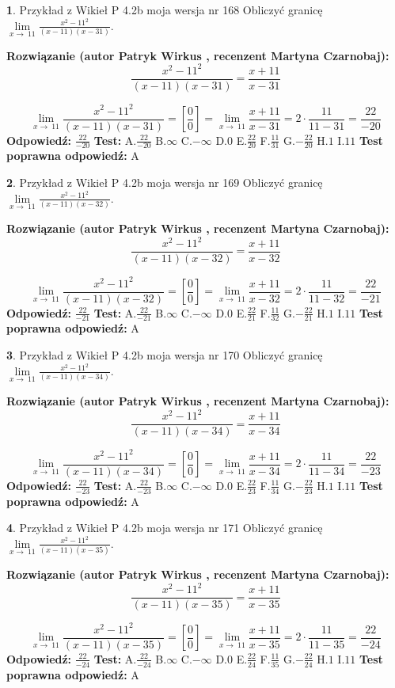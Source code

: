 \documentclass[12pt, a4paper]{article}
\theoremstyle{definition} %
\newtheorem{zad}{}
\newcommand{\zadStart}[1]{\begin{zad}#1\newline}
\newcommand{\zadStop}{\end{zad}}
\newcommand{\rozwStart}[2]{\noindent \textbf{Rozwiązanie (autor #1 , recenzent #2): }\newline}
\newcommand{\rozwStop}{\newline}
\newcommand{\odpStart}{\noindent \textbf{Odpowiedź:}\newline}
\newcommand{\odpStop}{\newline}
\newcommand{\testStart}{\noindent \textbf{Test:}\newline}
\newcommand{\testStop}{\newline}
\newcommand{\kluczStart}{\noindent \textbf{Test poprawna odpowiedź:}\newline}
\newcommand{\kluczStop}{\newline}
\begin{document}
\zadStart{Przykład z Wikieł P 4.2b moja wersja nr 168}
Obliczyć granicę $\lim\limits_{x\to\ 11}\frac{x^{2}-11^{2}}{(x-11)(x-31)}$.
\zadStop
\rozwStart{Patryk Wirkus}{Martyna Czarnobaj}
$$\frac{x^{2}-11^{2}}{(x-11)(x-31)}=\frac{x+11}{x-31}$$

$$\lim\limits_{x\to\ 11}\frac{x^{2}-11^{2}}{(x-11)(x-31)}=[\frac{0}{0}]=\lim\limits_{x\to\ 11}\frac{x+11}{x-31}=2 \cdot \frac{11}{11-31} = \frac{22}{-20}$$
\rozwStop
\odpStart
$\frac{22}{-20}$
\odpStop
\testStart
A.$\frac{22}{-20}$
B.$\infty$
C.$-\infty$
D.$0$
E.$\frac{22}{20}$
F.$\frac{11}{31}$
G.$-\frac{22}{20}$
H.$1$
I.$11$
\testStop
\kluczStart
A
\kluczStop



\zadStart{Przykład z Wikieł P 4.2b moja wersja nr 169}
Obliczyć granicę $\lim\limits_{x\to\ 11}\frac{x^{2}-11^{2}}{(x-11)(x-32)}$.
\zadStop
\rozwStart{Patryk Wirkus}{Martyna Czarnobaj}
$$\frac{x^{2}-11^{2}}{(x-11)(x-32)}=\frac{x+11}{x-32}$$

$$\lim\limits_{x\to\ 11}\frac{x^{2}-11^{2}}{(x-11)(x-32)}=[\frac{0}{0}]=\lim\limits_{x\to\ 11}\frac{x+11}{x-32}=2 \cdot \frac{11}{11-32} = \frac{22}{-21}$$
\rozwStop
\odpStart
$\frac{22}{-21}$
\odpStop
\testStart
A.$\frac{22}{-21}$
B.$\infty$
C.$-\infty$
D.$0$
E.$\frac{22}{21}$
F.$\frac{11}{32}$
G.$-\frac{22}{21}$
H.$1$
I.$11$
\testStop
\kluczStart
A
\kluczStop



\zadStart{Przykład z Wikieł P 4.2b moja wersja nr 170}
Obliczyć granicę $\lim\limits_{x\to\ 11}\frac{x^{2}-11^{2}}{(x-11)(x-34)}$.
\zadStop
\rozwStart{Patryk Wirkus}{Martyna Czarnobaj}
$$\frac{x^{2}-11^{2}}{(x-11)(x-34)}=\frac{x+11}{x-34}$$

$$\lim\limits_{x\to\ 11}\frac{x^{2}-11^{2}}{(x-11)(x-34)}=[\frac{0}{0}]=\lim\limits_{x\to\ 11}\frac{x+11}{x-34}=2 \cdot \frac{11}{11-34} = \frac{22}{-23}$$
\rozwStop
\odpStart
$\frac{22}{-23}$
\odpStop
\testStart
A.$\frac{22}{-23}$
B.$\infty$
C.$-\infty$
D.$0$
E.$\frac{22}{23}$
F.$\frac{11}{34}$
G.$-\frac{22}{23}$
H.$1$
I.$11$
\testStop
\kluczStart
A
\kluczStop



\zadStart{Przykład z Wikieł P 4.2b moja wersja nr 171}
Obliczyć granicę $\lim\limits_{x\to\ 11}\frac{x^{2}-11^{2}}{(x-11)(x-35)}$.
\zadStop
\rozwStart{Patryk Wirkus}{Martyna Czarnobaj}
$$\frac{x^{2}-11^{2}}{(x-11)(x-35)}=\frac{x+11}{x-35}$$

$$\lim\limits_{x\to\ 11}\frac{x^{2}-11^{2}}{(x-11)(x-35)}=[\frac{0}{0}]=\lim\limits_{x\to\ 11}\frac{x+11}{x-35}=2 \cdot \frac{11}{11-35} = \frac{22}{-24}$$
\rozwStop
\odpStart
$\frac{22}{-24}$
\odpStop
\testStart
A.$\frac{22}{-24}$
B.$\infty$
C.$-\infty$
D.$0$
E.$\frac{22}{24}$
F.$\frac{11}{35}$
G.$-\frac{22}{24}$
H.$1$
I.$11$
\testStop
\kluczStart
A
\kluczStop
\end{document}
